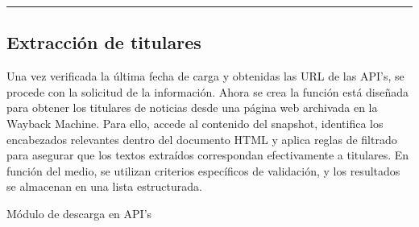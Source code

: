 \documentclass[letterpaper,10pt,spanish]{sphinxmanual}
\begin{document}
\bigskip\hrule\bigskip



\subsection{Extracción de titulares}
\label{\detokenize{DatosPreparacion:extraccion-de-titulares}}
\sphinxAtStartPar
Una vez verificada la última fecha de carga y obtenidas las URL de las API’s, se procede con la solicitud de la información. Ahora se crea la función está diseñada para obtener los titulares de noticias desde una página web archivada en la Wayback Machine. Para ello, accede al contenido del snapshot, identifica los encabezados relevantes dentro del documento HTML y aplica reglas de filtrado para asegurar que los textos extraídos correspondan efectivamente a titulares. En función del medio, se utilizan criterios específicos de validación, y los resultados se almacenan en una lista estructurada.

\sphinxAtStartPar
Módulo de descarga en API’s
\end{document}
